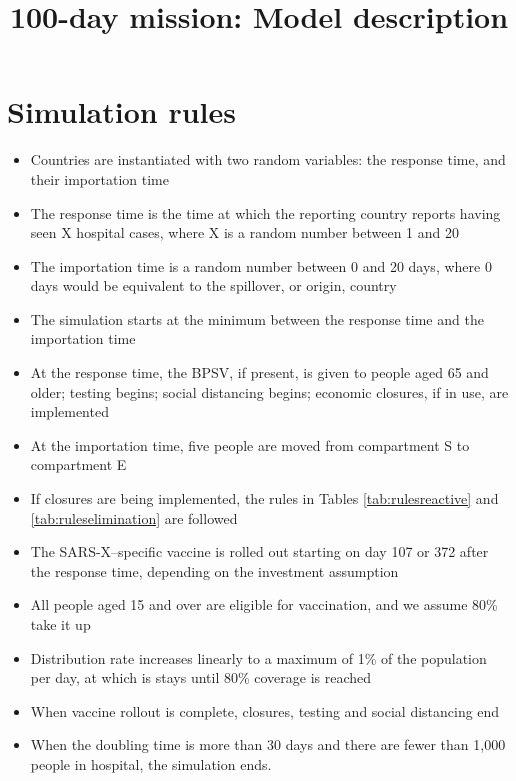 \documentclass[
]{article}
\title{100-day mission: Model description}
\author{}
\date{\vspace{-2.5em}}
\providecommand{\tightlist}{%
  \setlength{\itemsep}{0pt}\setlength{\parskip}{0pt}}
\begin{document}
\maketitle

\hypertarget{simulation-rules}{%
\section{Simulation rules}\label{simulation-rules}}

\begin{itemize}
\tightlist
\item
  Countries are instantiated with two random variables: the response time, and their importation time
\item
  The response time is the time at which the reporting country reports having seen X hospital cases, where X is a random number between 1 and 20
\item
  The importation time is a random number between 0 and 20 days, where 0 days would be equivalent to the spillover, or origin, country
\item
  The simulation starts at the minimum between the response time and the importation time
\item
  At the response time, the BPSV, if present, is given to people aged 65 and older; testing begins; social distancing begins; economic closures, if in use, are implemented
\item
  At the importation time, five people are moved from compartment S to compartment E
\item
  If closures are being implemented, the rules in Tables \ref{tab:rulesreactive} and \ref{tab:ruleselimination} are followed
\item
  The SARS-X--specific vaccine is rolled out starting on day 107 or 372 after the response time, depending on the investment assumption
\item
  All people aged 15 and over are eligible for vaccination, and we assume 80\% take it up
\item
  Distribution rate increases linearly to a maximum of 1\% of the population per day, at which is stays until 80\% coverage is reached
\item
  When vaccine rollout is complete, closures, testing and social distancing end
\item
  When the doubling time is more than 30 days and there are fewer than 1,000 people in hospital, the simulation ends.
\end{itemize}
\end{document}
